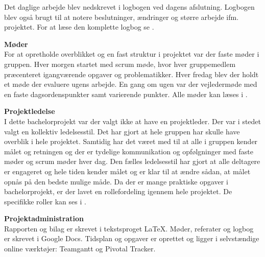Det daglige arbejde blev nedskrevet i logbogen ved dagens afslutning. Logbogen blev også brugt til at notere beslutninger, ændringer og større arbejde ifm. projektet. For at læse den komplette logbog se .

\textbf{Møder}\\
For at opretholde overblikket og en fast struktur i projektet var der faste møder i gruppen. Hver morgen startet med scrum møde, hvor hver gruppemedlem præcenteret igangværende opgaver og problematikker. Hver fredag blev der holdt et møde der evaluere ugens arbejde. En gang om ugen var der vejledermøde med en faste dagsordenspunkter samt varierende punkter. Alle møder kan læses i .

\textbf{Projektledelse}\\
I dette bachelorprojekt var der valgt ikke at have en projektleder. Der var i stedet valgt en kollektiv ledelsesstil. Det har gjort at hele gruppen har skulle have overblik i hele projektet. Samtidig har det været med til at alle i gruppen kender målet og retningen og der er tydelige kommunikation og opfølgninger med faste møder og scrum møder hver dag. Den fælles ledelsesstil har gjort at alle deltagere er engageret og hele tiden kender målet og er klar til at ændre sådan, at målet opnås på den bedste mulige måde. Da der er mange praktiske opgaver i bachelorprojekt, er der lavet en rollefordeling igennem hele projektet. De specifikke roller kan ses i .

\textbf{Projektadministration}\\
Rapporten og bilag er skrevet i tekstsproget \LaTeX. Møder, referater og logbog er skrevet i Google Docs. Tidsplan og opgaver er oprettet og ligger i selvstændige online værktøjer: Teamgantt og Pivotal Tracker.    

